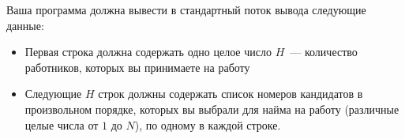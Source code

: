 Ваша программа должна вывести в стандартный поток вывода следующие данные:
\begin{itemize}
\item Первая строка должна содержать одно целое число $H$~--- количество работников, которых вы принимаете на работу
\item Следующие $H$ строк должны содержать список номеров кандидатов в произвольном порядке, которых вы выбрали для найма на работу (различные целые числа от $1$ до $N$), по одному в каждой строке.
\end{itemize}